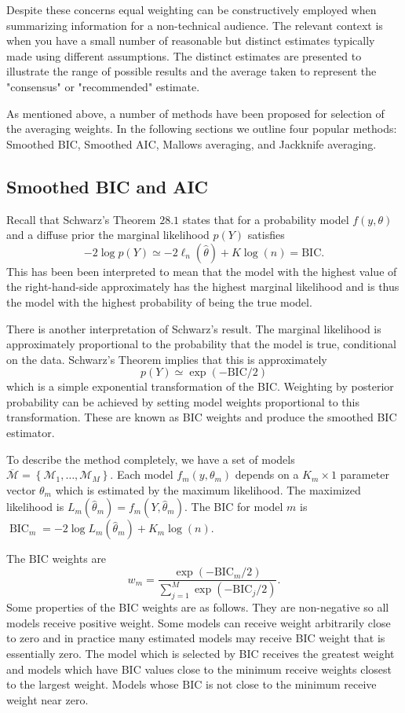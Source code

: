 \documentclass[10pt]{article}
\begin{document}
Despite these concerns equal weighting can be constructively employed when summarizing information for a non-technical audience. The relevant context is when you have a small number of reasonable but distinct estimates typically made using different assumptions. The distinct estimates are presented to illustrate the range of possible results and the average taken to represent the "consensus" or "recommended" estimate.

As mentioned above, a number of methods have been proposed for selection of the averaging weights. In the following sections we outline four popular methods: Smoothed BIC, Smoothed AIC, Mallows averaging, and Jackknife averaging.

\subsection{Smoothed BIC and AIC}
Recall that Schwarz's Theorem $28.1$ states that for a probability model $f(y, \theta)$ and a diffuse prior the marginal likelihood $p(Y)$ satisfies
$$
-2 \log p(Y) \simeq-2 \ell_{n}(\widehat{\theta})+K \log (n)=\mathrm{BIC} .
$$
This has been been interpreted to mean that the model with the highest value of the right-hand-side approximately has the highest marginal likelihood and is thus the model with the highest probability of being the true model.

There is another interpretation of Schwarz's result. The marginal likelihood is approximately proportional to the probability that the model is true, conditional on the data. Schwarz's Theorem implies that this is approximately
$$
p(Y) \simeq \exp (-\mathrm{BIC} / 2)
$$
which is a simple exponential transformation of the BIC. Weighting by posterior probability can be achieved by setting model weights proportional to this transformation. These are known as BIC weights and produce the smoothed BIC estimator.

To describe the method completely, we have a set of models $\overline{\mathscr{M}}=\left\{\mathscr{M}_{1}, \ldots, \mathscr{M}_{M}\right\}$. Each model $f_{m}\left(y, \theta_{m}\right)$ depends on a $K_{m} \times 1$ parameter vector $\theta_{m}$ which is estimated by the maximum likelihood. The maximized likelihood is $L_{m}\left(\widehat{\theta}_{m}\right)=f_{m}\left(Y, \widehat{\theta}_{m}\right)$. The BIC for model $m$ is $\operatorname{BIC}_{m}=-2 \log L_{m}\left(\widehat{\theta}_{m}\right)+K_{m} \log (n)$.

The $\mathrm{BIC}$ weights are
$$
w_{m}=\frac{\exp \left(-\mathrm{BIC}_{m} / 2\right)}{\sum_{j=1}^{M} \exp \left(-\mathrm{BIC}_{j} / 2\right)} .
$$
Some properties of the BIC weights are as follows. They are non-negative so all models receive positive weight. Some models can receive weight arbitrarily close to zero and in practice many estimated models may receive BIC weight that is essentially zero. The model which is selected by BIC receives the greatest weight and models which have BIC values close to the minimum receive weights closest to the largest weight. Models whose $\mathrm{BIC}$ is not close to the minimum receive weight near zero.
\end{document}
